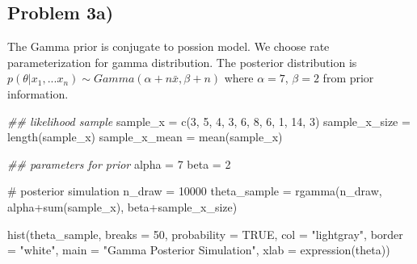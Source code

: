 \documentclass[
  letterpaper,
  DIV=11,
  numbers=noendperiod]{scrartcl}
\newenvironment{Shaded}{\begin{snugshade}}{\end{snugshade}}
\newcommand{\AttributeTok}[1]{\textcolor[rgb]{0.40,0.45,0.13}{#1}}
\newcommand{\CommentTok}[1]{\textcolor[rgb]{0.37,0.37,0.37}{#1}}
\newcommand{\ConstantTok}[1]{\textcolor[rgb]{0.56,0.35,0.01}{#1}}
\newcommand{\DecValTok}[1]{\textcolor[rgb]{0.68,0.00,0.00}{#1}}
\newcommand{\DocumentationTok}[1]{\textcolor[rgb]{0.37,0.37,0.37}{\textit{#1}}}
\newcommand{\FunctionTok}[1]{\textcolor[rgb]{0.28,0.35,0.67}{#1}}
\newcommand{\NormalTok}[1]{\textcolor[rgb]{0.00,0.23,0.31}{#1}}
\newcommand{\OtherTok}[1]{\textcolor[rgb]{0.00,0.23,0.31}{#1}}
\newcommand{\SpecialCharTok}[1]{\textcolor[rgb]{0.37,0.37,0.37}{#1}}
\newcommand{\StringTok}[1]{\textcolor[rgb]{0.13,0.47,0.30}{#1}}
\begin{document}
\subsection{Problem 3a)}\label{problem-3a}

The Gamma prior is conjugate to possion model. We choose rate
parameterization for gamma distribution. The posterior distribution is
\(p(\theta|x_1,...x_n) \sim Gamma(\alpha+n\bar{x}, \beta+n)\) where
\(\alpha=7\), \(\beta=2\) from prior information.

\begin{Shaded}
\begin{Highlighting}[]
\DocumentationTok{\#\# likelihood sample}
\NormalTok{sample\_x }\OtherTok{=} \FunctionTok{c}\NormalTok{(}\DecValTok{3}\NormalTok{, }\DecValTok{5}\NormalTok{, }\DecValTok{4}\NormalTok{, }\DecValTok{3}\NormalTok{, }\DecValTok{6}\NormalTok{, }\DecValTok{8}\NormalTok{, }\DecValTok{6}\NormalTok{, }\DecValTok{1}\NormalTok{, }\DecValTok{14}\NormalTok{, }\DecValTok{3}\NormalTok{)}
\NormalTok{sample\_x\_size }\OtherTok{=} \FunctionTok{length}\NormalTok{(sample\_x)}
\NormalTok{sample\_x\_mean }\OtherTok{=} \FunctionTok{mean}\NormalTok{(sample\_x)}
\end{Highlighting}
\end{Shaded}

\begin{Shaded}
\begin{Highlighting}[]
\DocumentationTok{\#\# parameters for prior}
\NormalTok{alpha }\OtherTok{=} \DecValTok{7}
\NormalTok{beta }\OtherTok{=} \DecValTok{2}

\CommentTok{\# posterior simulation}
\NormalTok{n\_draw }\OtherTok{=} \DecValTok{10000}
\NormalTok{theta\_sample }\OtherTok{=} \FunctionTok{rgamma}\NormalTok{(n\_draw, alpha}\SpecialCharTok{+}\FunctionTok{sum}\NormalTok{(sample\_x), beta}\SpecialCharTok{+}\NormalTok{sample\_x\_size)}

\FunctionTok{hist}\NormalTok{(theta\_sample, }\AttributeTok{breaks =} \DecValTok{50}\NormalTok{, }\AttributeTok{probability =} \ConstantTok{TRUE}\NormalTok{,}
     \AttributeTok{col =} \StringTok{"lightgray"}\NormalTok{, }\AttributeTok{border =} \StringTok{"white"}\NormalTok{,}
     \AttributeTok{main =} \StringTok{"Gamma Posterior Simulation"}\NormalTok{,}
     \AttributeTok{xlab =} \FunctionTok{expression}\NormalTok{(theta))}
\end{Highlighting}
\end{Shaded}
\end{document}
